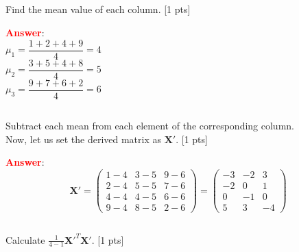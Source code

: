 \documentclass{homework}
\begin{document}
    \subsection{}
    Find the mean value of each column. [1 pts]
    
    \textbf{\textcolor{red}{Answer}}: \\
    
    $\mu_1 = \dfrac{1+2+4+9}{4} = 4$ \\
    $\mu_2 = \dfrac{3+5+4+8}{4} = 5$ \\
    $\mu_3 = \dfrac{9+7+6+2}{4} = 6$ 
    
    \subsection{}
    Subtract each mean from each element of the corresponding column. \\
    Now, let us set the derived matrix as $\textbf{X}'$. [1 pts]
    
    \textbf{\textcolor{red}{Answer}}: \\
       $$ \textbf{X}' = \left( \begin{matrix} 1-4 & 3-5 & 9-6 \\ 2-4 & 5-5 & 7-6 \\ 4-4 & 4-5 & 6-6 \\ 9-4 & 8-5 & 2-6 \end{matrix} \right) =
        \left( \begin{matrix} -3 & -2 & 3 \\ -2 & 0 & 1 \\ 0 & -1 & 0 \\ 5 & 3 & -4 \end{matrix} \right) $$
    
    \subsection{}
    Calculate $\frac{1}{4-1}\textbf{X}'^T\textbf{X}'.$ [1 pts]
    
\end{document}
